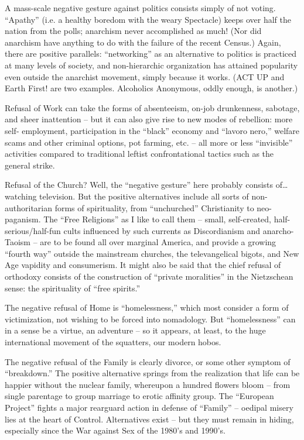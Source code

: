 \documentclass[a4paper,english,10pt,twoside]{article}
\begin{document}
\medskip
A mass-scale negative gesture against politics consists simply of not voting. \enquote{Apathy} (i.e. a healthy boredom with the weary Spectacle) keeps over half the nation from the polls; anarchism never accomplished as much! (Nor did anarchism have anything to do with the failure of the recent Census.) Again, there are positive parallels: \enquote{networking} as an alternative to politics is practiced at many levels of society, and non-hierarchic organization has attained popularity even outside the anarchist movement, simply because it works. (ACT UP and Earth First! are two examples. Alcoholics Anonymous, oddly enough, is another.)

\medskip
Refusal of Work can take the forms of absenteeism, on-job drunkenness, sabotage, and sheer inattention -- but it can also give rise to new modes of rebellion: more self- employment, participation in the \enquote{black} economy and \enquote{lavoro nero,} welfare scams and other criminal options, pot farming, etc. -- all more or less \enquote{invisible} activities compared to traditional leftist confrontational tactics such as the general strike.

\medskip
Refusal of the Church? Well, the \enquote{negative gesture} here probably consists of… watching television. But the positive alternatives include all sorts of non-authoritarian forms of spirituality, from \enquote{unchurched} Christianity to neo- paganism. The \enquote{Free Religions} as I like to call them --  small, self-created, half-serious/half-fun cults influenced by such currents as Discordianism and anarcho-Taoism -- are to be found all over marginal America, and provide a growing \enquote{fourth way} outside the mainstream churches, the televangelical bigots, and New Age vapidity and consumerism. It might also be said that the chief refusal of orthodoxy consists of the construction of \enquote{private moralities} in the Nietzschean sense: the spirituality of \enquote{free spirits.}

\medskip
The negative refusal of Home is \enquote{homelessness,} which most consider a form of victimization, not wishing to be forced into nomadology. But \enquote{homelessness} can in a sense be a virtue, an adventure -- so it appears, at least, to the huge international movement of the squatters, our modern hobos.

\medskip
The negative refusal of the Family is clearly divorce, or some other symptom of \enquote{breakdown.} The positive alternative springs from the realization that life can be happier without the nuclear family, whereupon a hundred flowers bloom -- from single parentage to group marriage to erotic affinity group. The \enquote{European Project} fights a major rearguard action in defense of \enquote{Family} -- oedipal misery lies at the heart of Control. Alternatives exist -- but they must remain in hiding, especially since the War against Sex of the 1980's and 1990's.
\end{document}
